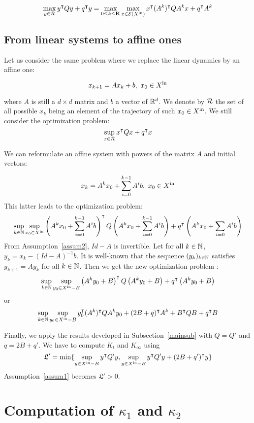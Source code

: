 \documentclass[10pt]{article}
\begin{document}
\begin{corollary}
 \[
\max_{y\in\mathcal{R}} y^\intercal Q y+q^\intercal y=\max_{0\leq k\leq \mathbf{K}} \max_{x\in \mathcal{E}(X^\mathrm{in})} x^\intercal (A^k)^\intercal Q A^k x+q^\intercal A^k
\]
\end{corollary}

\subsection{From linear systems to affine ones}
\label{affine}
Let us consider the same problem where we replace the linear dynamics by an affine one:

\[
x_{k+1}=A x_k+b,\ x_0\in X^\mathrm{in}
\]

where $A$ is still a $d\times d$ matrix and $b$ a vector of $\mathbb R^d$. We denote by $\mathcal{R}$ the set of all possible $x_k$ being an element of the trajectory of such $x_0\in X^\mathrm{in}$. We still consider the optimization problem:
\[
\sup_{x\in\mathcal{R}} x^\intercal Q x+q^\intercal x
\]

We can reformulate an affine system with powers of the matrix $A$ and initial vectors: 

\[
x_{k}=A^k x_0+\sum_{i=0}^{k-1} A^i b,\ x_0\in \xin
\]
This latter leads to the optimization problem:
\[
\sup_{k\in\mathbb{N}} \sup_{x_0\in X^\mathrm{in}} \left(A^k x_0+\sum_{i=0}^{k-1} A^i b\right)^\intercal Q  \left(A^k x_0+\sum_{i=0}^{k-1} A^i b\right)+q^\intercal  \left(A^k x_0+\sum_{i=0} A^i b\right)
\]
From Assumption~\ref{assum2}, $Id-A$ is invertible. Let for all $k\in\mathbb{N}$, $y_k=x_k-(Id-A)^{-1} b$. It is well-known that the sequence $(y_k)_{k\in\mathbb{N}}$ satisfies $y_{k+1}=A y_k$ for all $k\in\mathbb{N}$. Then we get the new optimization problem : 
\[
\sup_{k\in\mathbb{N}} \sup_{y_0\in X^\mathrm{in}-B} \left(A^k y_0+B\right)^\intercal Q  \left(A^k y_0+B\right)+q^\intercal  \left(A^k y_0+B\right)
\]
or
\[
\sup_{k\in\mathbb{N}} \sup_{y_0\in X^\mathrm{in}-B} y_0^\intercal (A^k)^\intercal Q  A^k y_0+(2B+q)^\intercal A^k +B^\intercal Q B+q^\intercal B
\]

Finally, we apply the results developed in Subsection~\ref{mainsub} with $Q=Q'$ and $q=2B+q'$. We have to compute $K_t$ and $K_\infty$ using 
\[
\mathfrak{L}'=\min\{\sup_{y\in X^\mathrm{in}-B} y^\intercal Q' y,\sup_{y\in X^\mathrm{in}-B} y^\intercal Q' y+(2B+q')^\intercal y\}
\]
Assumption~\ref{assum1} becomes $\mathfrak{L}'>0$.
\section{Computation of $\kappa_1$ and $\kappa_2$}
\end{document}
